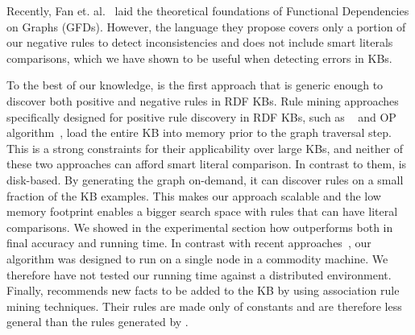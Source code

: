 Recently, Fan et. al.~\cite{FanFDGraphs} laid the theoretical foundations of Functional Dependencies on Graphs (GFDs). 
However, the language they propose covers only a portion of our negative rules to detect inconsistencies and does not include smart literals comparisons, which we have shown to be useful when detecting errors in KBs.

To the best of our knowledge, \krd is the first approach that is generic enough %
to discover both positive and negative rules in RDF KBs.
Rule mining approaches specifically designed for positive rule discovery in RDF KBs, such as \amie~\cite{galarraga2015fast} and OP algorithm~\cite{Chen:2016}, load the entire KB into memory prior to 
the graph traversal step. %
This is a strong constraints for their applicability over large KBs, and neither of these two approaches can afford smart literal comparison. 
In contrast to them, \krd is disk-based. By generating the graph on-demand, it can discover rules on a small fraction of the KB examples. This makes our approach scalable and the low memory footprint enables a bigger search space with rules that can have literal comparisons. %
We showed in the experimental section how \krd outperforms \amie both in final accuracy and running time.
In contrast with recent approaches~\cite{DBLP:conf/sigmod/FaridRIHC16}, our algorithm was designed to run on a single node in a commodity machine. We therefore have not tested our running time against a distributed environment. %
Finally, \cite{abedjan2014amending} recommends new facts to be added to the KB by using association rule mining techniques. Their rules are made only of constants and are therefore less general than the rules generated by \krd.

